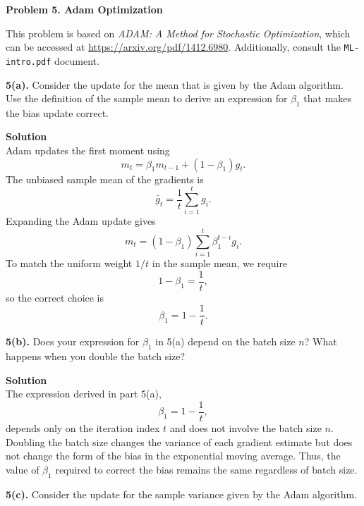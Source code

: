 \documentclass[11pt]{article}
\begin{document}
	\newpage
	
	\vspace{0.5em}
	\noindent\textbf{Problem 5. Adam Optimization}
	
	This problem is based on \textit{ADAM: A Method for Stochastic Optimization}, which can be accessed at
	\url{https://arxiv.org/pdf/1412.6980}. Additionally, consult the \texttt{ML-intro.pdf} document.
	
	\vspace{0.5em}
	\noindent\textbf{5(a).} Consider the update for the mean that is given by the Adam algorithm.
	Use the definition of the sample mean to derive an expression for \(\beta_{1}\) that makes
	the bias update correct.
	
	\noindent\textbf{Solution}\\
	Adam updates the first moment using
	\[
	m_t = \beta_1 m_{t-1} + (1-\beta_1) g_t.
	\]
	The unbiased sample mean of the gradients is
	\[
	\bar{g}_t = \frac{1}{t}\sum_{i=1}^t g_i.
	\]
	Expanding the Adam update gives
	\[
	m_t = (1-\beta_1)\sum_{i=1}^t \beta_1^{t-i} g_i.
	\]
	To match the uniform weight \(1/t\) in the sample mean, we require
	\[
	1-\beta_1 = \frac{1}{t},
	\]
	so the correct choice is
	\[
	\beta_1 = 1 - \frac{1}{t}.
	\]
	
	\vspace{0.5em}
	\noindent\textbf{5(b).} Does your expression for \(\beta_{1}\) in 5(a) depend on the batch size \(n\)?
	What happens when you double the batch size?
	
	\noindent\textbf{Solution}\\
	The expression derived in part 5(a),
	\[
	\beta_1 = 1 - \frac{1}{t},
	\]
	depends only on the iteration index \(t\) and does not involve the batch size \(n\).
	Doubling the batch size changes the variance of each gradient estimate but does not
	change the form of the bias in the exponential moving average. Thus, the value of
	\(\beta_1\) required to correct the bias remains the same regardless of batch size.
	
	\vspace{0.5em}
	\noindent\textbf{5(c).} Consider the update for the sample variance given by the Adam algorithm.
	
\end{document}

